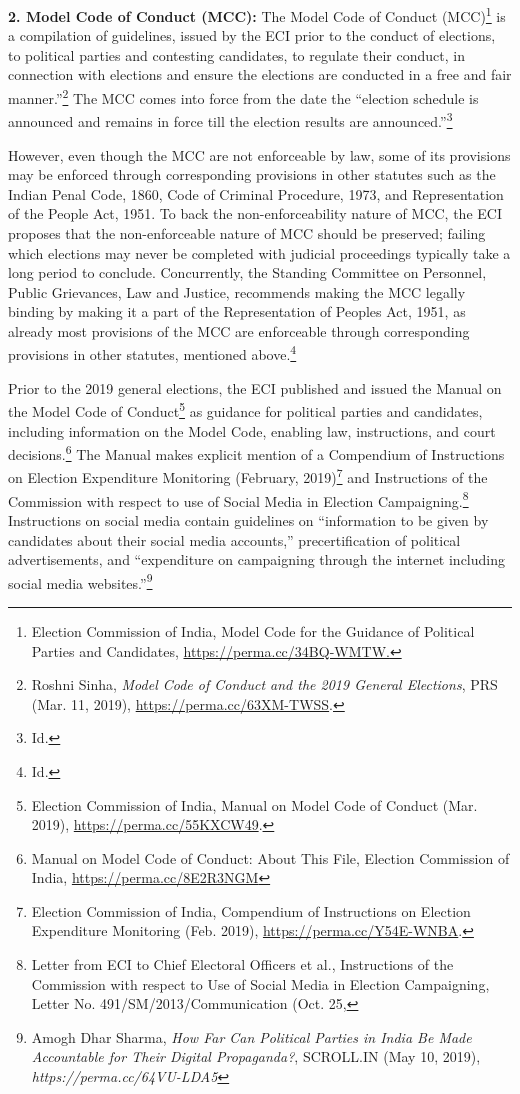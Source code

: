 \begin{multicols}{2}
\noi
{\large\bfseries 2. Model Code of Conduct (MCC):}
The Model Code of Conduct (MCC)\footnote{Election Commission of India, Model Code for the Guidance of Political Parties and
Candidates, \url{https://perma.cc/34BQ-WMTW.}} is a
compilation of guidelines, issued by the ECI prior to the conduct of elections, to political
parties and contesting candidates, to regulate their conduct, in connection with elections and
ensure the elections are conducted in a free and fair manner.”\footnote{Roshni Sinha, \textit{Model Code of Conduct and the 2019 General Elections}, PRS (Mar. 11,
2019), \url{https://perma.cc/63XM-TWSS}.} The MCC comes into force
from the date the “election schedule is announced and remains in force till the election results
are announced.”\footnote{Id.}

\noi
However, even though the MCC are not enforceable by law, some of its provisions may be
enforced through corresponding provisions in other statutes such as the Indian Penal Code,
1860, Code of Criminal Procedure, 1973, and Representation of the People Act, 1951. To
back the non-enforceability nature of MCC, the ECI proposes that the non-enforceable nature
of MCC should be preserved; failing which elections may never be completed with judicial
proceedings typically take a long period to conclude. Concurrently, the Standing Committee
on Personnel, Public Grievances, Law and Justice, recommends making the MCC legally
binding by making it a part of the Representation of Peoples Act, 1951, as already most
provisions of the MCC are enforceable through corresponding provisions in other statutes,
mentioned above.\footnote{Id.}

\noi
Prior to the 2019 general elections, the ECI published and issued the Manual on the Model
Code of Conduct\footnote{Election Commission of India, Manual on Model Code of Conduct (Mar. 2019), \url{https://perma.cc/55KXCW49}.} as guidance for political parties and candidates, including information on
the Model Code, enabling law, instructions, and court decisions.\footnote{Manual on Model Code of Conduct: About This File, Election Commission of India, \url{https://perma.cc/8E2R3NGM}} The Manual makes explicit mention of a Compendium of Instructions on Election Expenditure Monitoring (February,
2019)\footnote{Election Commission of India, Compendium of Instructions on Election Expenditure Monitoring (Feb.
2019), \url{https://perma.cc/Y54E-WNBA}.} and Instructions of the Commission with respect to use of Social Media in Election
Campaigning.\footnote{Letter from ECI to Chief Electoral Officers et al., Instructions of the Commission with respect to Use of
Social Media in Election Campaigning, Letter No. 491/SM/2013/Communication (Oct. 25,} Instructions on social media contain guidelines on “information to be given by candidates about their social media accounts,” precertification of political advertisements,
and “expenditure on campaigning through the internet including social media websites.”\footnote{Amogh Dhar Sharma, \textit{How Far Can Political Parties in India Be Made Accountable for Their Digital Propaganda?}, SCROLL.IN (May 10, 2019), \textit{https://perma.cc/64VU-LDA5}}


\end{multicols}
